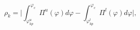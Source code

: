 \begin{equation}\label{rhok}
\rho_{k}= \biggr|\int_{\varphi^{u}_{kp}}^{\varphi_{c}}
\Pi^{u}(\varphi) d\varphi
-\int_{\varphi^{l}_{kp}}^{\varphi_{c}} \Pi^{l}(\varphi)
d\varphi\biggr|,
\end{equation}

